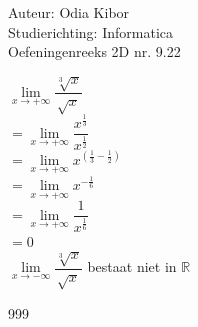 \documentclass[a4paper]{article}
\begin{document}
  
\noindent \large Auteur: Odia Kibor \\
\noindent \large Studierichting: Informatica\\
\noindent \large Oefeningenreeks 2D nr. 9.22\\

\medskip

\normalsize


$\lim\limits_{x \rightarrow +\infty} \dfrac{\sqrt[3]{x}}{\sqrt{x}}$\\

$= \lim\limits_{x \rightarrow +\infty} \dfrac{x^{\tfrac{1}{3}}}{x^{\tfrac{1}{2}}}$\\

$= \lim\limits_{x \rightarrow +\infty} x^{\left(\tfrac{1}{3}-\tfrac{1}{2}\right)}$\\

$= \lim\limits_{x \rightarrow +\infty} x^{-\tfrac{1}{6}}$\\

$= \lim\limits_{x \rightarrow +\infty} \dfrac{1}{x^{\tfrac{1}{6}}}$\\

$=0$ \\

$\lim\limits_{x \rightarrow -\infty} \dfrac{\sqrt[3]{x}}{\sqrt{x}}$ bestaat niet in $ \mathbb{R}$













\begin{thebibliography}{999}
\end{thebibliography}
\end{document}
